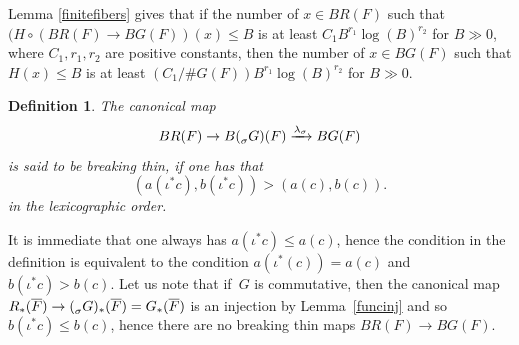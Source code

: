 \documentclass[a4paper,english,12pt]{amsart}
\newcommand{\oF}{\overline F}
\newcommand{\sG}{\prescript{}{\sigma}G}
\DeclareMathOperator{\Aut}{Aut}
\newtheorem{mydef}[equation]{Definition}
\numberwithin{equation}{subsection}
\begin{document}
Lemma \ref{finitefibers} gives that if the number of $x\in BR(F)$ such that $(H\circ (BR(F)\to BG(F))(x)\leq B$ is at least $C_1 B^{r_1}\log(B)^{r_2}$ for $B\gg 0$, where $C_1, r_1, r_2$ are positive constants, then the number of $x\in BG(F)$ such that $H(x)\leq  B$ is at least $(C_1/\# G(F)) B^{r_1}\log(B)^{r_2}$ for $B\gg 0$.
\begin{mydef}
The canonical map $$BR(F)\to B(\sG)(F)\xrightarrow{\lambda_{\sigma}}BG(F)$$ is said to be breaking thin, if one has that $$(a(\iota^*c), b(\iota^*c))> (a(c), b(c)).$$
in the lexicographic order.  
\end{mydef}
It is immediate that one always has $a(\iota^*c)\leq a(c)$, hence the condition in the definition is equivalent to the condition $a(\iota^*(c))=a(c)$ and $b(\iota^*c)>b(c)$. Let us note that if~$G$ is commutative, then the canonical map $R_*(\oF)\to (\sG)_*(\oF)=G_*(\oF)$ is an injection by Lemma~\ref{funcinj} and so $b(\iota^*c)\leq b(c)$, hence there are no breaking thin maps $BR(F)\to BG(F)$. %
\end{document}
